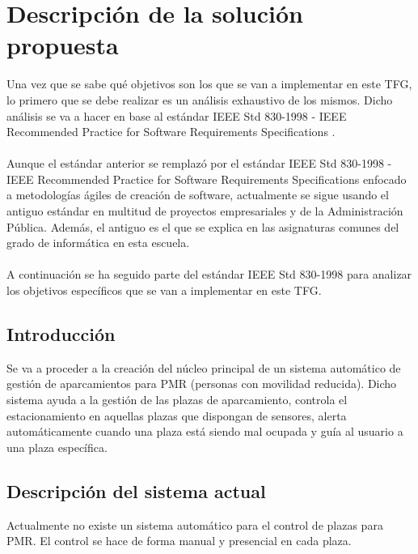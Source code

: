 \chapter{Descripción de la solución propuesta}
Una vez que se sabe qué objetivos son los que se van a implementar en este TFG, lo primero que se debe realizar es un análisis exhaustivo de los mismos. Dicho análisis se va a hacer en base al estándar IEEE Std 830-1998 - IEEE Recommended Practice for Software Requirements Specifications \cite{IEE_830-1998}.
\\\\
Aunque el estándar anterior se remplazó por el estándar IEEE Std 830-1998 - IEEE Recommended Practice for Software Requirements Specifications \cite{IEE_29148-2011} enfocado a metodologías ágiles de creación de software, actualmente se sigue usando el antiguo estándar en multitud de proyectos empresariales y de la Administración Pública. Además, el antiguo es el que se explica en las asignaturas comunes del grado de informática \cite{guia-docente-fis} en esta escuela.
\\\\
A continuación se ha seguido parte del estándar IEEE Std 830-1998 \cite{IEE_830-1998} para analizar los objetivos específicos que se van a implementar en este TFG.
\section{Introducción}
Se va a proceder a la creación del núcleo principal de un sistema automático de gestión de aparcamientos para PMR (personas con movilidad reducida). Dicho sistema ayuda a la gestión de las plazas de aparcamiento, controla el estacionamiento en aquellas plazas que dispongan de sensores, alerta automáticamente cuando una plaza está siendo mal ocupada y guía al usuario a una plaza específica.
\section{Descripción del sistema actual}
Actualmente no existe un sistema automático para el control de plazas para PMR. El control se hace de forma manual y presencial en cada plaza.
